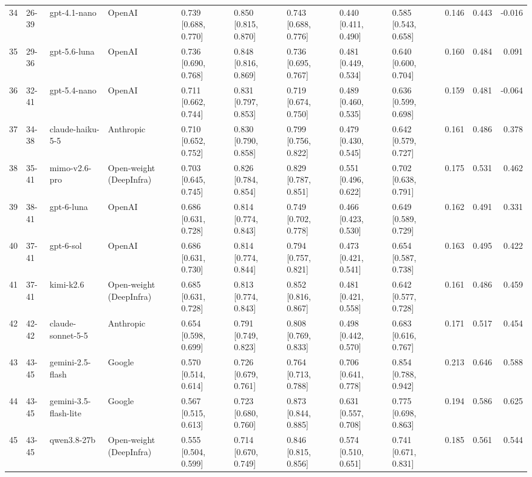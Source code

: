 \begin{table}
\begin{tabular}{rllllllllrrr}
34 & 26-39 & gpt-4.1-nano & OpenAI & 0.739 [0.688, 0.770] & 0.850 [0.815, 0.870] & 0.743 [0.688, 0.776] & 0.440 [0.411, 0.490] & 0.585 [0.543, 0.658] & 0.146 & 0.443 & -0.016 \\
35 & 29-36 & gpt-5.6-luna & OpenAI & 0.736 [0.690, 0.768] & 0.848 [0.816, 0.869] & 0.736 [0.695, 0.767] & 0.481 [0.449, 0.534] & 0.640 [0.600, 0.704] & 0.160 & 0.484 & 0.091 \\
36 & 32-41 & gpt-5.4-nano & OpenAI & 0.711 [0.662, 0.744] & 0.831 [0.797, 0.853] & 0.719 [0.674, 0.750] & 0.489 [0.460, 0.535] & 0.636 [0.599, 0.698] & 0.159 & 0.481 & -0.064 \\
37 & 34-38 & claude-haiku-5-5 & Anthropic & 0.710 [0.652, 0.752] & 0.830 [0.790, 0.858] & 0.799 [0.756, 0.822] & 0.479 [0.430, 0.545] & 0.642 [0.579, 0.727] & 0.161 & 0.486 & 0.378 \\
38 & 35-41 & mimo-v2.6-pro & Open-weight (DeepInfra) & 0.703 [0.645, 0.745] & 0.826 [0.784, 0.854] & 0.829 [0.787, 0.851] & 0.551 [0.496, 0.622] & 0.702 [0.638, 0.791] & 0.175 & 0.531 & 0.462 \\
39 & 38-41 & gpt-6-luna & OpenAI & 0.686 [0.631, 0.728] & 0.814 [0.774, 0.843] & 0.749 [0.702, 0.778] & 0.466 [0.423, 0.530] & 0.649 [0.589, 0.729] & 0.162 & 0.491 & 0.331 \\
40 & 37-41 & gpt-6-sol & OpenAI & 0.686 [0.631, 0.730] & 0.814 [0.774, 0.844] & 0.794 [0.757, 0.821] & 0.473 [0.421, 0.541] & 0.654 [0.587, 0.738] & 0.163 & 0.495 & 0.422 \\
41 & 37-41 & kimi-k2.6 & Open-weight (DeepInfra) & 0.685 [0.631, 0.728] & 0.813 [0.774, 0.843] & 0.852 [0.816, 0.867] & 0.481 [0.421, 0.558] & 0.642 [0.577, 0.728] & 0.161 & 0.486 & 0.459 \\
42 & 42-42 & claude-sonnet-5-5 & Anthropic & 0.654 [0.598, 0.699] & 0.791 [0.749, 0.823] & 0.808 [0.769, 0.833] & 0.498 [0.442, 0.570] & 0.683 [0.616, 0.767] & 0.171 & 0.517 & 0.454 \\
43 & 43-45 & gemini-2.5-flash & Google & 0.570 [0.514, 0.614] & 0.726 [0.679, 0.761] & 0.764 [0.713, 0.788] & 0.706 [0.641, 0.778] & 0.854 [0.788, 0.942] & 0.213 & 0.646 & 0.588 \\
44 & 43-45 & gemini-3.5-flash-lite & Google & 0.567 [0.515, 0.613] & 0.723 [0.680, 0.760] & 0.873 [0.844, 0.885] & 0.631 [0.557, 0.708] & 0.775 [0.698, 0.863] & 0.194 & 0.586 & 0.625 \\
45 & 43-45 & qwen3.8-27b & Open-weight (DeepInfra) & 0.555 [0.504, 0.599] & 0.714 [0.670, 0.749] & 0.846 [0.815, 0.856] & 0.574 [0.510, 0.651] & 0.741 [0.671, 0.831] & 0.185 & 0.561 & 0.544 \\
\bottomrule
\end{tabular}
\end{table}
